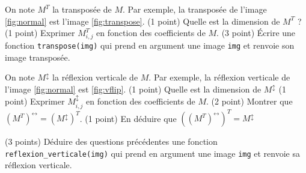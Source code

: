     \ques On note $ M^T $ la transposée de $ M $. Par exemple, la transposée de l'image \autoref{fig:normal} est l'image \autoref{fig:transpose}.
    \ssques (1 point) Quelle est la dimension de $ M^T $ ?
    \ssques (1 point) Exprimer $ M^T_{i,j} $ en fonction des coefficients de $ M $.
    \ssques (3 point) Écrire une fonction \texttt{transpose(img)} qui prend en argument une image \texttt{img} et renvoie son image transposée.

    \ques On note $ M^{\updownarrow} $ la réflexion verticale de $ M $. Par exemple, la réflexion verticale de l'image \autoref{fig:normal} est \autoref{fig:vflip}.
    \ssques (1 point) Quelle est la dimension de $ M^{\updownarrow} $
    \ssques (1 point) Exprimer $ M^{\updownarrow}_{i,j} $ en fonction des coefficients de $ M $.
    \ssques (2 point) Montrer que $ (M^{T})^{\leftrightarrow} = (M^{\updownarrow})^T $.
    \ssques (1 point) En déduire que $ ((M^T)^{\leftrightarrow})^T = M^{\updownarrow} $

    \ques (3 points) Déduire des questions précédentes une fonction \texttt{reflexion_verticale(img)} qui prend en argument une image \texttt{img} et renvoie sa réflexion verticale.

